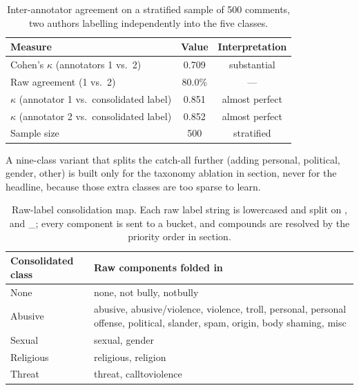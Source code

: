 \documentclass[11pt,a4paper]{article}
\def\cref#1{section}%
\def\texttt#1{#1}%
\begin{document}
\begin{table}[!htbp]
\centering
\caption{Inter-annotator agreement on a stratified sample of 500 comments, two authors labelling independently into the five classes.}
\label{tab:iaa}
\small
\begin{tabular}{@{}lcc@{}}
\toprule
\textbf{Measure} & \textbf{Value} & \textbf{Interpretation} \\
\midrule
Cohen's $\kappa$ (annotators 1 vs.\ 2) & 0.709 & substantial \\
Raw agreement (1 vs.\ 2) & 80.0\% & --- \\
$\kappa$ (annotator 1 vs.\ consolidated label) & 0.851 & almost perfect \\
$\kappa$ (annotator 2 vs.\ consolidated label) & 0.852 & almost perfect \\
Sample size & 500 & stratified \\
\bottomrule
\end{tabular}
\end{table}

A nine-class variant that splits the catch-all further (adding \texttt{personal, political, gender, other}) is built only for the taxonomy ablation in \cref{sec:ablation-results}, never for the headline, because those extra classes are too sparse to learn.

\begin{table}[!htbp]
\centering
\caption{Raw-label consolidation map. Each raw label string is lowercased and split on \texttt{,} and \texttt{\_}; every component is sent to a bucket, and compounds are resolved by the priority order in \cref{eq:priority}.}
\label{tab:consolidation}
\small
\begin{tabularx}{\textwidth}{@{}lX@{}}
\toprule
\textbf{Consolidated class} & \textbf{Raw components folded in} \\
\midrule
None & \texttt{none}, \texttt{not bully}, \texttt{notbully} \\
Abusive & \texttt{abusive}, \texttt{abusive/violence}, \texttt{violence}, \texttt{troll}, \texttt{personal}, \texttt{personal offense}, \texttt{political}, \texttt{slander}, \texttt{spam}, \texttt{origin}, \texttt{body shaming}, \texttt{misc} \\
Sexual & \texttt{sexual}, \texttt{gender} \\
Religious & \texttt{religious}, \texttt{religion} \\
Threat & \texttt{threat}, \texttt{calltoviolence} \\
\bottomrule
\end{tabularx}
\end{table}
\end{document}
